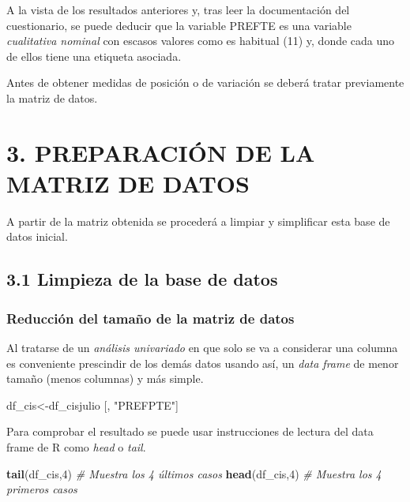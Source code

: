 \documentclass[
  12 pt,
  a4paper,
]{article}
\newenvironment{Shaded}{\begin{snugshade}}{\end{snugshade}}
\newcommand{\CommentTok}[1]{\textcolor[rgb]{0.56,0.35,0.01}{\textit{#1}}}
\newcommand{\DecValTok}[1]{\textcolor[rgb]{0.00,0.00,0.81}{#1}}
\newcommand{\FunctionTok}[1]{\textcolor[rgb]{0.13,0.29,0.53}{\textbf{#1}}}
\newcommand{\NormalTok}[1]{#1}
\newcommand{\OtherTok}[1]{\textcolor[rgb]{0.56,0.35,0.01}{#1}}
\newcommand{\StringTok}[1]{\textcolor[rgb]{0.31,0.60,0.02}{#1}}
\begin{document}
A la vista de los resultados anteriores y, tras leer la documentación
del cuestionario, se puede deducir que la variable PREFTE es una
variable \emph{cualitativa nominal} con escasos valores como es habitual
(11) y, donde cada uno de ellos tiene una etiqueta asociada.

Antes de obtener medidas de posición o de variación se deberá tratar
previamente la matriz de datos.

\newpage

\hypertarget{preparaciuxf3n-de-la-matriz-de-datos}{%
\section{3. PREPARACIÓN DE LA MATRIZ DE
DATOS}\label{preparaciuxf3n-de-la-matriz-de-datos}}

A partir de la matriz obtenida se procederá a limpiar y simplificar esta
base de datos inicial.

\hypertarget{limpieza-de-la-base-de-datos}{%
\subsection{3.1 Limpieza de la base de
datos}\label{limpieza-de-la-base-de-datos}}

\hypertarget{reducciuxf3n-del-tamauxf1o-de-la-matriz-de-datos}{%
\subsubsection{Reducción del tamaño de la matriz de
datos}\label{reducciuxf3n-del-tamauxf1o-de-la-matriz-de-datos}}

Al tratarse de un \emph{análisis univariado} en que solo se va a
considerar una columna es conveniente prescindir de los demás datos
usando así, un \emph{data frame} de menor tamaño (menos columnas) y más
simple.

\begin{Shaded}
\begin{Highlighting}[]
\NormalTok{df\_cis}\OtherTok{\textless{}{-}}\NormalTok{df\_cisjulio [, }\StringTok{"PREFPTE"}\NormalTok{]}
\end{Highlighting}
\end{Shaded}

Para comprobar el resultado se puede usar instrucciones de lectura del
data frame de R como \emph{head} o \emph{tail}.

\begin{Shaded}
\begin{Highlighting}[]
\FunctionTok{tail}\NormalTok{(df\_cis,}\DecValTok{4}\NormalTok{) }\CommentTok{\# Muestra los 4 últimos casos}
\FunctionTok{head}\NormalTok{(df\_cis,}\DecValTok{4}\NormalTok{) }\CommentTok{\# Muestra los 4 primeros casos}
\end{Highlighting}
\end{Shaded}
\end{document}
